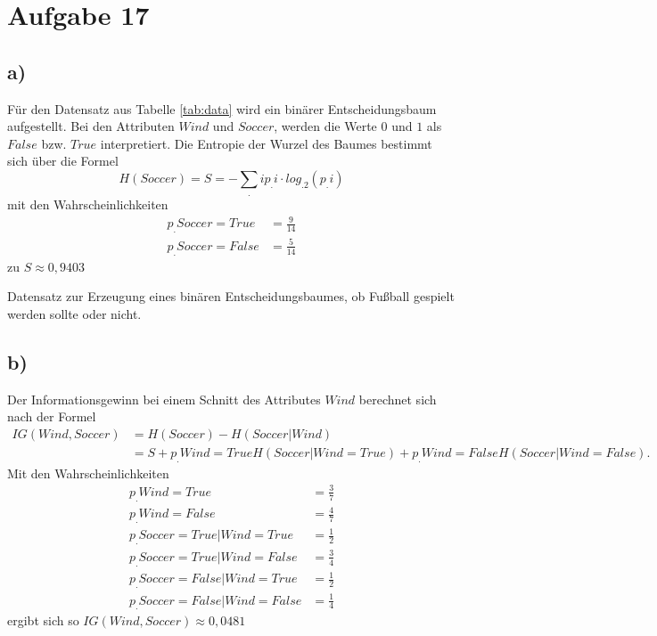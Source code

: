 \section{Aufgabe 17}
\label{sec:Aufgabe17}

\subsection*{a)}
Für den Datensatz aus Tabelle \ref{tab:data} wird ein binärer Entscheidungsbaum aufgestellt. Bei den Attributen $Wind$ und $Soccer$, werden die Werte $0$ und $1$ als $False$ bzw. $True$ interpretiert.
Die Entropie der Wurzel des Baumes bestimmt sich über die Formel
\begin{equation}
H(Soccer)= S = -\sum_.i p_.i\cdot log_.2(p_.i)
\end{equation}
mit den Wahrscheinlichkeiten
\begin{align*}
p_.{Soccer = True} &= \frac{9}{14}\\
p_.{Soccer = False} &= \frac{5}{14}
\end{align*}
zu $S\approx 0,9403$

\begin{table}
	\centering
	\caption{Datensatz zur Erzeugung eines binären Entscheidungsbaumes, ob Fußball gespielt werden sollte oder nicht.}
	
	\label{tab:data}
\end{table}

\subsection*{b)}
Der Informationsgewinn bei einem Schnitt des Attributes $Wind$ berechnet sich nach der Formel
\begin{align*}
IG(Wind,Soccer) &= H(Soccer) - H(Soccer|Wind)\\
&= S + p_.{Wind = True} H(Soccer|Wind = True )+ p_.{Wind = False} H(Soccer|Wind = False)\text{.}
\end{align*}	
Mit den Wahrscheinlichkeiten
\begin{align*}
p_.{Wind = True} &= \frac{3}{7}\\
p_.{Wind = False} &= \frac{4}{7}\\
p_.{Soccer = True|Wind = True} &= \frac{1}{2}\\
p_.{Soccer = True|Wind = False} &= \frac{3}{4}\\
p_.{Soccer = False|Wind = True} &= \frac{1}{2}\\
p_.{Soccer = False|Wind = False} &= \frac{1}{4}
\end{align*}
ergibt sich so $IG(Wind,Soccer)\approx 0,0481$

